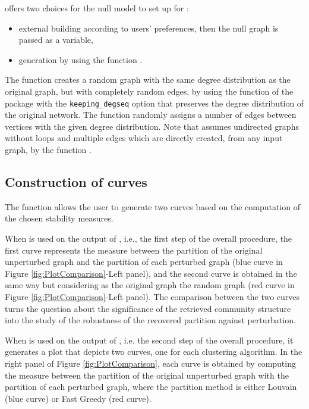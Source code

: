  offers two choices for the null model to set up for : 
\begin{itemize}
\item external building according to users' preferences, then the null graph is passed as a variable, 
\item generation by using the function . 
\end{itemize}
The function  creates a random graph with the same degree distribution as the original graph, but with completely random edges, by using the  function of the  package with the {\tt keeping\_degseq} option that preserves the degree distribution of the original network. The function  randomly assigns a number of edges between vertices with the given degree distribution. 
Note that  assumes undirected graphs without loops and multiple edges which are directly created, from any input graph, by the function .


\subsection{Construction of curves}
The  function allows the user to generate two curves based on the computation of the chosen stability measures. 

When  is used on the output of , i.e., the first step of the overall procedure, the first curve represents the measure between the partition of the original unperturbed graph and the partition of each perturbed graph (blue curve in Figure \ref{fig:PlotComparison}-Left panel), and the second curve is obtained in the same way but considering as the original graph the random graph (red curve in Figure \ref{fig:PlotComparison}-Left panel). The comparison between the two curves turns the question about the significance of the retrieved community structure into the study of the robustness of the recovered partition against perturbation. 

When  is used on the output of , i.e. the second step of the overall procedure, it generates a plot that depicts two curves, one for each clustering algorithm. 
In the right panel of Figure \ref{fig:PlotComparison}, each curve is obtained by computing the measure between the partition of the original unperturbed graph with the partition of each perturbed graph, where the partition method is either Louvain (blue curve) or Fast Greedy (red curve).

